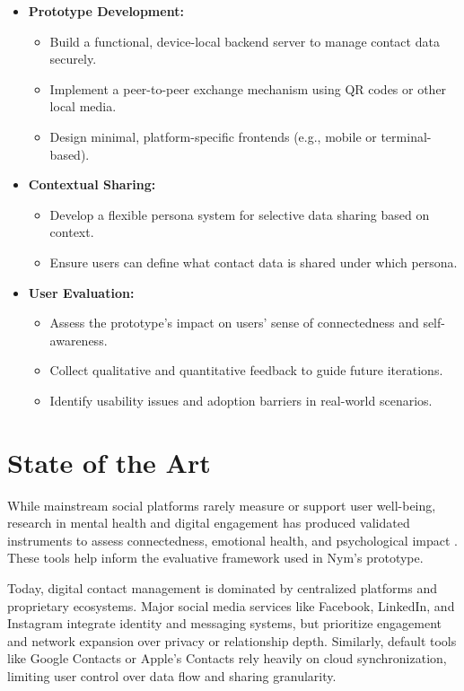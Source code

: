 \documentclass{imc-inf}
\begin{document}
\begin{itemize}
  \item \textbf{Prototype Development:}
  \begin{itemize}
    \item Build a functional, device-local backend server to manage contact data securely.
    \item Implement a peer-to-peer exchange mechanism using QR codes or other local media.
    \item Design minimal, platform-specific frontends (e.g., mobile or terminal-based).
  \end{itemize}

  \item \textbf{Contextual Sharing:}
  \begin{itemize}
    \item Develop a flexible persona system for selective data sharing based on context.
    \item Ensure users can define what contact data is shared under which persona.
  \end{itemize}

  \item \textbf{User Evaluation:}
  \begin{itemize}
    \item Assess the prototype's impact on users’ sense of connectedness and self-awareness.
    \item Collect qualitative and quantitative feedback to guide future iterations.
    \item Identify usability issues and adoption barriers in real-world scenarios.
  \end{itemize}
\end{itemize}


\chapter{State of the Art}

While mainstream social platforms rarely measure or support user well-being, research in mental health and digital engagement has produced validated instruments to assess connectedness, emotional health, and psychological impact \cite{batterham2020mental}. These tools help inform the evaluative framework used in Nym’s prototype.

Today, digital contact management is dominated by centralized platforms and proprietary ecosystems. Major social media services like Facebook, LinkedIn, and Instagram integrate identity and messaging systems, but prioritize engagement and network expansion over privacy or relationship depth. Similarly, default tools like Google Contacts or Apple’s Contacts rely heavily on cloud synchronization, limiting user control over data flow and sharing granularity.
\end{document}

